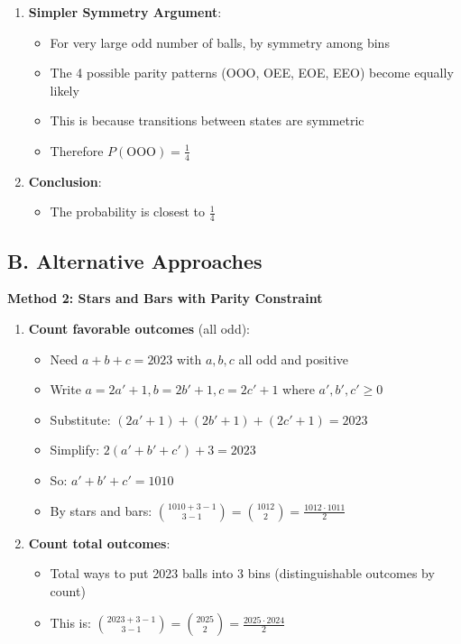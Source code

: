 \documentclass[12pt]{article}
\begin{document}
\begin{solutionbox}
\begin{enumerate}[leftmargin=*]
    \item \textbf{Simpler Symmetry Argument}: 
    \begin{itemize}
        \item For very large odd number of balls, by symmetry among bins
        \item The 4 possible parity patterns (OOO, OEE, EOE, EEO) become equally likely
        \item This is because transitions between states are symmetric
        \item Therefore $P(\text{OOO}) = \frac{1}{4}$
    \end{itemize}
    
    \item \textbf{Conclusion}: 
    \begin{itemize}
        \item The probability is closest to $\frac{1}{4}$
    \end{itemize}
\end{enumerate}

\subsection*{B. Alternative Approaches}

\textbf{Method 2: Stars and Bars with Parity Constraint}

\begin{enumerate}
    \item \textbf{Count favorable outcomes} (all odd):
    \begin{itemize}
        \item Need $a + b + c = 2023$ with $a, b, c$ all odd and positive
        \item Write $a = 2a' + 1, b = 2b' + 1, c = 2c' + 1$ where $a', b', c' \geq 0$
        \item Substitute: $(2a'+1) + (2b'+1) + (2c'+1) = 2023$
        \item Simplify: $2(a' + b' + c') + 3 = 2023$
        \item So: $a' + b' + c' = 1010$
        \item By stars and bars: $\binom{1010 + 3 - 1}{3 - 1} = \binom{1012}{2} = \frac{1012 \cdot 1011}{2}$
    \end{itemize}
    
    \item \textbf{Count total outcomes}:
    \begin{itemize}
        \item Total ways to put 2023 balls into 3 bins (distinguishable outcomes by count)
        \item This is: $\binom{2023 + 3 - 1}{3 - 1} = \binom{2025}{2} = \frac{2025 \cdot 2024}{2}$
    \end{itemize}
    

\end{enumerate}
\end{solutionbox}
\end{document}

